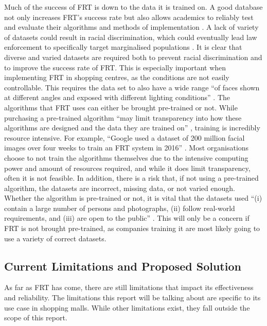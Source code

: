 \documentclass{article}
\begin{document}
Much of the success of FRT is down to the data it is trained on. A good database not only increases FRT's success rate but also allows academics to reliably test and evaluate their algorithms and methods of implementation \cite{PPFOfFRT}. A lack of variety of datasets could result in racial discrimination, which could eventually lead law enforcement to specifically target marginalised populations \cite{RacialDiscrimination}. It is clear that diverse and varied datasets are required both to prevent racial discrimination and to improve the success rate of FRT. This is especially important when implementing FRT in shopping centres, as the conditions are not easily controllable. This requires the data set to also have a wide range “of faces shown at different angles and exposed with
different lighting conditions” \cite{CDEI2024}. The algorithms that FRT uses can either be brought pre-trained or not. While purchasing a pre-trained algorithm “may limit transparency into how these algorithms are designed and the data they are trained on” \cite{CDEI2024}, training is incredibly resource intensive. For example, “Google used a dataset of 200 million facial images over four weeks to train an FRT system in 2016” \cite{CDEI2024}. Most organisations choose to not train the algorithms themselves due to the intensive computing power and amount of resources required, and while it does limit transparency, often it is not feasible. In addition, there is a risk that, if not using a pre-trained algorithm, the datasets are incorrect, missing data, or not varied enough. Whether the algorithm is pre-trained or not, it is vital that the datasets used “(i) contain a large number of persons and photographs, (ii) follow real-world requirements, and (iii) are open to the public” \cite{PPFOfFRT}. This will only be a concern if FRT is not brought pre-trained, as companies training it are most likely going to use a variety of correct datasets.

\subsection{Current Limitations and Proposed Solution}
As far as FRT has come, there are still limitations that impact its effectiveness and reliability. The limitations this report will be talking about are specific to its use case in shopping malls. While other limitations exist, they fall outside the scope of this report.
\end{document}

